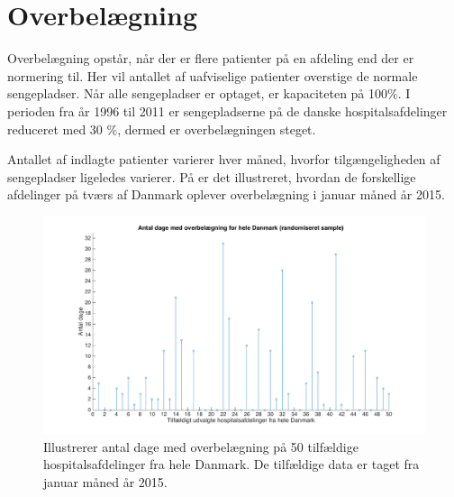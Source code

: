 \section{Overbelægning}\label{sec:overbelaegning}

Overbelægning opstår, når der er flere patienter på en afdeling end der er normering til. Her vil antallet af uafviselige patienter overstige de normale sengepladser. Når alle sengepladser er optaget, er kapaciteten på 100\%. I perioden fra år 1996 til 2011 er sengepladserne på de danske hospitalsafdelinger reduceret med 30 \%, dermed er overbelægningen steget\cite{Madsen2014}.

Antallet af indlagte patienter varierer hver måned, hvorfor tilgængeligheden af sengepladser ligeledes varierer. På  er det illustreret, hvordan de forskellige afdelinger  på tværs af Danmark oplever overbelægning i januar måned år 2015.

\begin{figure}[H]
\centering
\includegraphics[width=1\textwidth]{figures/overbelaegning_ran}
\caption{Illustrerer antal dage med overbelægning på 50 tilfældige hospitalsafdelinger fra hele Danmark. De tilfældige data er taget fra januar måned år 2015. \cite{SDS2015}} 
\label{fig:overbelaegning_ran}
\end{figure}




